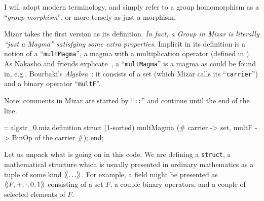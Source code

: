 \begin{def-remark}
I will adopt modern terminology, and simply refer to a group
homomorphism as a ``\emph{group morphism}'', or more tersely as just a
morphism.
\end{def-remark}

 Mizar takes the first version as its definition.
\emph{In fact, a Group in Mizar is literally ``just a Magma'' satisfying some extra properties.} Implicit in its
definition is a notion of a ``\lstinline{multMagma}'', a magma with a
multiplication operator (defined in ). As Nakasho and
friends explicate~\cite{nakasho2014formalization}, a ``\lstinline{multMagma}''
is a magma as could be found in, e.g., Bourbaki's
\emph{Algebra}~\cite[see Ch.I\S1.1]{bourbaki1974elements}: it
consists of a set (which Mizar calls its ``\lstinline{carrier}'') and a
binary operator ``\lstinline{multF}''.

Note: comments in Mizar are started by ``\lstinline{::}'' and continue until
the end of the line.

\begin{mizar}
:: algstr_0.miz
definition
  struct (1-sorted) multMagma (# carrier -> set,
  multF -> BinOp of the carrier
  #);
end;
\end{mizar}

Let us unpack what is going on in this code. We are defining a
\lstinline{struct}, a mathematical structure
which is usually presented in ordinary mathematics as a tuple of some
kind $\struct{\dots}$. For example, a field might be presented as
$\struct{F, +, \cdot, 0, 1}$ consisting of a set $F$, a couple binary
operators, and a couple of selected elements of $F$.

